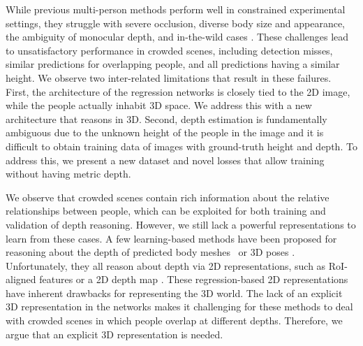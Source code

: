 \documentclass[10pt,twocolumn,letterpaper]{article}
\begin{document}
While previous multi-person methods perform well in constrained experimental settings, they struggle with severe occlusion, diverse body size and appearance, the ambiguity of monocular depth, and in-the-wild cases \cite{jiang2020coherent,moon2019camera,zhen2020smap,wang2020hmor}.
These challenges lead to unsatisfactory performance in crowded scenes, including detection misses, similar predictions for overlapping people, and all predictions having a similar height. We observe two inter-related limitations that result in these failures.
First, the architecture of the regression networks is closely tied to the 2D image, while the people actually inhabit 3D space. 
We address this with a new architecture that reasons in 3D.
Second, depth estimation is fundamentally ambiguous due to the unknown height of the people in the image and it is difficult to obtain training data of images with ground-truth height and depth.
To address this, we present a new dataset and novel losses that allow training without having metric depth.



We observe that crowded scenes contain rich information about the relative relationships between people, which can be exploited for both training and validation of depth reasoning.
However, we still lack a powerful representations to learn from these cases.
A few learning-based methods have been proposed for reasoning about the depth of predicted body meshes~\cite{jiang2020coherent} or 3D poses \cite{moon2019camera,zhen2020smap,wang2020hmor}.
Unfortunately, they all reason about depth via 2D representations, such as RoI-aligned features \cite{moon2019camera,jiang2020coherent} or a 2D depth map \cite{zhen2020smap,wang2020hmor}.
These regression-based 2D representations have inherent drawbacks for representing the 3D world.
The lack of an explicit 3D representation in the networks makes it challenging for these methods to deal with crowded scenes in which people overlap at different depths.
Therefore, we argue that an explicit 3D representation is needed.
\end{document}
